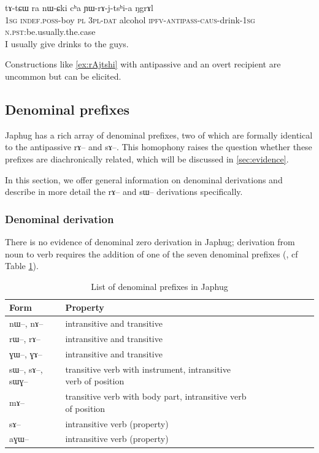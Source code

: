 \documentclass[oldfontcommands,oneside,a4paper,11pt]{article}
\newcommand{\ipa}[1]{{\phon \mbox{#1}}} %
\begin{document}
   \begin{exe} 
\ex \label{ex:rAjtshi}
\gll \ipa{aʑo} 	\ipa{tɤ-tɕɯ} 	\ipa{ra} 	\ipa{nɯ-ɕki} 	\ipa{cʰa} 	\ipa{ɲɯ-rɤ-j-tsʰi-a} 	\ipa{ŋgrɤl} \\
   1\textsc{sg} \textsc{indef.poss}-boy \textsc{pl} 3\textsc{pl-dat} alcohol \textsc{ipfv-antipass-caus}-drink-\textsc{1sg} \textsc{n.pst}:be.usually.the.case     \\
 \glt     I usually give drinks to the guys.
\end{exe} 
 Constructions like \ref{ex:rAjtshi} with antipassive and an overt recipient are uncommon but can be elicited.  
 

\subsection{Denominal prefixes} \label{subsec:other}
Japhug has a rich array of denominal prefixes, two of which are formally identical to the antipassive \ipa{rɤ}-- and \ipa{sɤ}--. This homophony raises the question whether these prefixes are diachronically related, which will be discussed in \ref{sec:evidence}. 

In this section, we offer general information on denominal derivations  and describe in more detail the \ipa{rɤ}-- and \ipa{sɯ}-- derivations specifically.

\subsubsection{Denominal derivation } \label{subsubsec:denominal}
There is no  evidence of denominal zero derivation in Japhug; derivation from noun to verb requires the addition of one of the seven denominal prefixes (\citealt[1217]{jacques12incorp}, cf Table \ref{tab:denom.pref}). 

\begin{table}[H] \centering
\caption{List of denominal prefixes in Japhug}\label{tab:denom.pref} 
\begin{tabular}{lllllllll} \toprule
Form& Property \\
\midrule
\ipa{nɯ}--, \ipa{nɤ}-- & intransitive and transitive \\
\ipa{rɯ}--, \ipa{rɤ}-- & intransitive and transitive \\
\ipa{ɣɯ}--, \ipa{ɣɤ}-- & intransitive and transitive \\
\ipa{sɯ}--, \ipa{sɤ}--, \ipa{sɯɣ}--  & transitive verb with instrument, intransitive verb of position \\
\ipa{mɤ}-- & transitive verb with body part, intransitive verb of position \\
\ipa{sɤ}-- & intransitive verb (property) \\
\ipa{aɣɯ}-- & intransitive verb (property) \\
    \bottomrule
\end{tabular}
\end{table}
\end{document}
